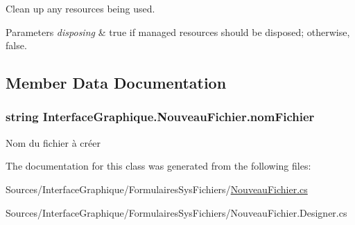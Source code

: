 Clean up any resources being used. 


\begin{DoxyParams}{Parameters}
{\em disposing} & true if managed resources should be disposed; otherwise, false.\\
\hline
\end{DoxyParams}


\subsection{Member Data Documentation}
\subsubsection[{\texorpdfstring{nom\+Fichier}{nomFichier}}]{\setlength{\rightskip}{0pt plus 5cm}string Interface\+Graphique.\+Nouveau\+Fichier.\+nom\+Fichier}\hypertarget{class_interface_graphique_1_1_nouveau_fichier_a67f78efe104bcc9d7ad7f2a8e105379a}{}\label{class_interface_graphique_1_1_nouveau_fichier_a67f78efe104bcc9d7ad7f2a8e105379a}


Nom du fichier à créer 



The documentation for this class was generated from the following files\+:\begin{DoxyCompactItemize}
\item 
Sources/\+Interface\+Graphique/\+Formulaires\+Sys\+Fichiers/\hyperlink{_nouveau_fichier_8cs}{Nouveau\+Fichier.\+cs}\item 
Sources/\+Interface\+Graphique/\+Formulaires\+Sys\+Fichiers/Nouveau\+Fichier.\+Designer.\+cs\end{DoxyCompactItemize}
